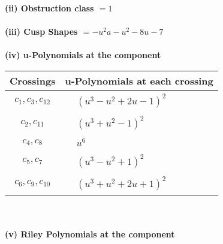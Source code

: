 \documentclass[1p]{elsarticle_modified}
\theoremstyle{definition}
\begin{document}
\flushleft \textbf{(ii) Obstruction class $= 1$}\\~\\
\flushleft \textbf{(iii) Cusp Shapes $= - u^2 a- u^2-8 u-7$}\\~\\
\newpage\renewcommand{\arraystretch}{1}
\flushleft \textbf{(iv) u-Polynomials at the component}\newline \\
\begin{tabular}{m{50pt}|m{274pt}}
Crossings & \hspace{64pt}u-Polynomials at each crossing \\
\hline $$\begin{aligned}c_{1},c_{3},c_{12}\end{aligned}$$&$\begin{aligned}
&(u^3- u^2+2 u-1)^2
\end{aligned}$\\
\hline $$\begin{aligned}c_{2},c_{11}\end{aligned}$$&$\begin{aligned}
&(u^3+u^2-1)^2
\end{aligned}$\\
\hline $$\begin{aligned}c_{4},c_{8}\end{aligned}$$&$\begin{aligned}
&u^6
\end{aligned}$\\
\hline $$\begin{aligned}c_{5},c_{7}\end{aligned}$$&$\begin{aligned}
&(u^3- u^2+1)^2
\end{aligned}$\\
\hline $$\begin{aligned}c_{6},c_{9},c_{10}\end{aligned}$$&$\begin{aligned}
&(u^3+u^2+2 u+1)^2
\end{aligned}$\\
\hline
\end{tabular}\\~\\
\newpage\renewcommand{\arraystretch}{1}
\flushleft \textbf{(v) Riley Polynomials at the component}\newline \\
\end{document}
